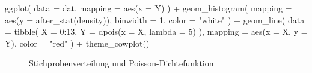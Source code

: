 \documentclass[
  a4paper,
  DIV=11,
  oneside]{scrreprt}
\newenvironment{Shaded}{\begin{snugshade}}{\end{snugshade}}
\newcommand{\AttributeTok}[1]{\textcolor[rgb]{0.40,0.45,0.13}{#1}}
\newcommand{\DecValTok}[1]{\textcolor[rgb]{0.68,0.00,0.00}{#1}}
\newcommand{\FunctionTok}[1]{\textcolor[rgb]{0.28,0.35,0.67}{#1}}
\newcommand{\NormalTok}[1]{\textcolor[rgb]{0.00,0.23,0.31}{#1}}
\newcommand{\SpecialCharTok}[1]{\textcolor[rgb]{0.37,0.37,0.37}{#1}}
\newcommand{\StringTok}[1]{\textcolor[rgb]{0.13,0.47,0.30}{#1}}
\begin{document}
\begin{Shaded}
\begin{Highlighting}[]
\FunctionTok{ggplot}\NormalTok{(}
    \AttributeTok{data =}\NormalTok{ dat, }
    \AttributeTok{mapping =} \FunctionTok{aes}\NormalTok{(}\AttributeTok{x =}\NormalTok{ Y)}
\NormalTok{) }\SpecialCharTok{+}
    \FunctionTok{geom\_histogram}\NormalTok{(}
        \AttributeTok{mapping =} \FunctionTok{aes}\NormalTok{(}\AttributeTok{y =} \FunctionTok{after\_stat}\NormalTok{(density)), }
        \AttributeTok{binwidth =} \DecValTok{1}\NormalTok{, }
        \AttributeTok{color =} \StringTok{"white"}
\NormalTok{    ) }\SpecialCharTok{+}
    \FunctionTok{geom\_line}\NormalTok{(}
        \AttributeTok{data =} \FunctionTok{tibble}\NormalTok{(}
            \AttributeTok{X =} \DecValTok{0}\SpecialCharTok{:}\DecValTok{13}\NormalTok{,}
            \AttributeTok{Y =} \FunctionTok{dpois}\NormalTok{(}\AttributeTok{x =}\NormalTok{ X, }\AttributeTok{lambda =} \DecValTok{5}\NormalTok{)}
\NormalTok{        ),}
        \AttributeTok{mapping =} \FunctionTok{aes}\NormalTok{(}\AttributeTok{x =}\NormalTok{ X, }\AttributeTok{y =}\NormalTok{ Y),}
        \AttributeTok{color =} \StringTok{"red"}
\NormalTok{    ) }\SpecialCharTok{+}
    \FunctionTok{theme\_cowplot}\NormalTok{()}
\end{Highlighting}
\end{Shaded}

\begin{figure}[t]


\caption{\label{fig-poissonexample}Stichprobenverteilung und
Poisson-Dichtefunktion}

\end{figure}%
\end{document}
